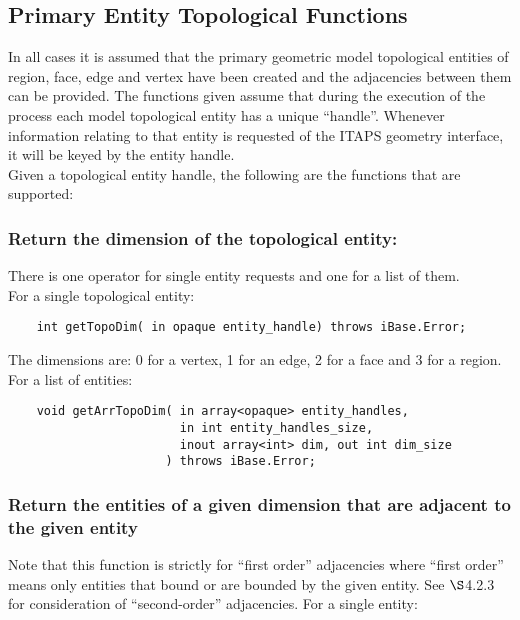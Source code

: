 \documentclass{article}
\begin{document}
\subsection{Primary Entity Topological Functions}
In all cases it is assumed that the primary geometric model 
topological entities of region, face, edge and vertex have been 
created and the adjacencies between them can be provided. The 
functions given assume that during the execution of the process 
each model topological entity has a unique ``handle''. Whenever 
information relating to that entity is requested of the ITAPS 
geometry interface, it will be keyed by the entity handle.\\

\hspace{-16pt}Given a topological entity handle, the following are the 
functions that are supported:

\subsubsection{Return the dimension of the topological entity:}
There is one operator for single entity requests and one 
for a list of them. \\

\hspace{-16pt}For a single topological entity:

\begin{verbatim}
    int getTopoDim( in opaque entity_handle) throws iBase.Error;
\end{verbatim}	
The dimensions are: 0 for a vertex, 1 for an edge, 2 for 
a face and 3 for a region.\\

\hspace{-16pt}For a list of entities:

\begin{verbatim}
    void getArrTopoDim( in array<opaque> entity_handles, 
                        in int entity_handles_size, 
                        inout array<int> dim, out int dim_size
                      ) throws iBase.Error;
\end{verbatim}

\subsubsection{Return the entities of a given dimension that 
are adjacent to the given entity}
Note that this function is strictly for ``first order'' adjacencies 
where ``first order'' means only entities that bound or are bounded 
by the given entity. See $\S$4.2.3 for consideration of ``second-order'' adjacencies. 
For a single entity:
\end{document}
